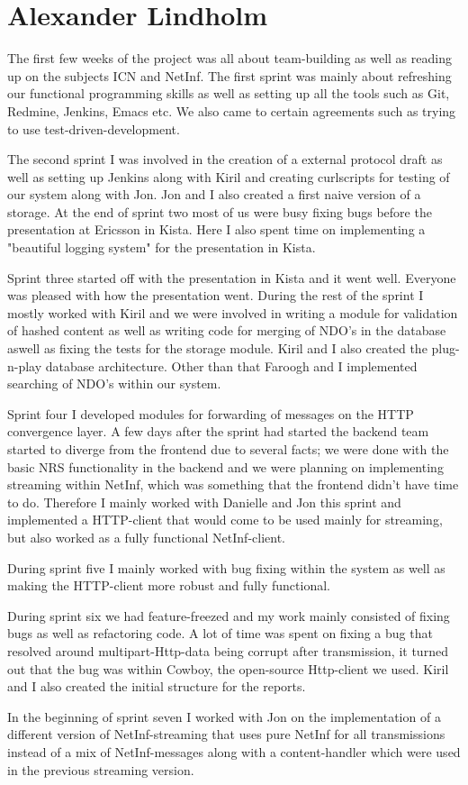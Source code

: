 \section{Alexander Lindholm}
The first few weeks of the project was all about team-building as well as reading up on the subjects ICN and NetInf. The first sprint was mainly about refreshing our functional programming skills as well as setting up all the tools such as Git, Redmine, Jenkins, Emacs etc. We also came to certain agreements such as trying to use test-driven-development. 

The second sprint I was involved in the creation of a external protocol draft as well as setting up Jenkins along with Kiril and creating curlscripts for testing of our system along with Jon. Jon and I also created a first naive version of a storage. At the end of sprint two most of us were busy fixing bugs before the presentation at Ericsson in Kista. Here I also spent time on implementing a "beautiful logging system" for the presentation in Kista.

Sprint three started off with the presentation in Kista and it went well. Everyone was pleased with how the presentation went. During the rest of the sprint I mostly worked with Kiril and we were involved in writing a module for validation of hashed content as well as writing code for merging of NDO's in the database aswell as fixing the tests for the storage module. Kiril and I also created the plug-n-play database architecture. Other than that Faroogh and I implemented searching of NDO's within our system.

Sprint four I developed modules for forwarding of messages on the HTTP convergence layer.
A few days after the sprint had started the backend team started to diverge from the frontend due to several facts;
we were done with the basic NRS functionality in the backend and we were planning on implementing streaming within NetInf, which was something that the frontend didn't have time to do. 
Therefore I mainly worked with Danielle and Jon this sprint and implemented a HTTP-client that would come to be used mainly for streaming, but also worked as a fully functional NetInf-client. 

During sprint five I mainly worked with bug fixing within the system as well as making the HTTP-client more robust and fully functional.

During sprint six we had feature-freezed and my work mainly consisted of fixing bugs as well as refactoring code. A lot of time was spent on fixing a bug that resolved around multipart-Http-data being corrupt after transmission, it turned out that the bug was within Cowboy, the open-source Http-client we used. Kiril and I also created the initial structure for the reports. 

In the beginning of sprint seven I worked with Jon on the implementation of a different version of NetInf-streaming that uses pure NetInf for all transmissions instead of a mix of NetInf-messages along with a content-handler which were used in the previous streaming version. 

